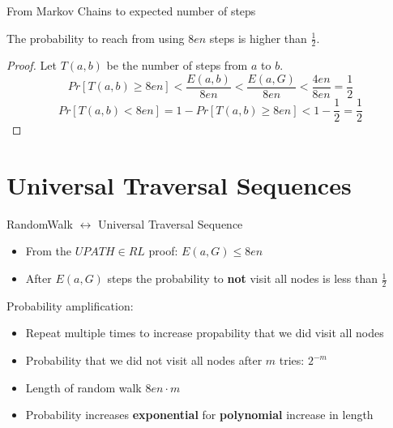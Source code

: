 \begin{frame}{From Markov Chains to expected number of steps}

\begin{theorem}
The probability to reach  from  using $8en$ steps is higher than $\frac{1}{2}$.
\end{theorem}

\begin{proof}
Let $T(a, b)$ be the number of steps from $a$ to $b$.
$$
Pr[T(a, b) \geq 8en] < \frac{E(a, b)}{8en}
                     < \frac{E(a, G)}{8en}
                     < \frac{4en}{8en} = \frac{1}{2}
$$
$$
Pr[T(a, b) < 8en] = 1 - Pr[T(a, b) \geq 8en]
                  < 1 - \frac{1}{2} = \frac{1}{2}
$$
\end{proof}

\end{frame}

\section{Universal Traversal
Sequences}\label{universal-traversal-sequences}

\begin{frame}{RandomWalk $\leftrightarrow$ Universal Traversal Sequence}

\begin{itemize}
\itemsep1pt\parskip0pt
\item
  From the $UPATH \in RL$ proof: $E(a, G) \leq 8en$
\item
  After $E(a, G)$ steps the probability to \textbf{not} visit all nodes
  is less than $\frac{1}{2}$
\end{itemize}

Probability amplification:

\begin{itemize}
\itemsep1pt\parskip0pt
\item
  Repeat multiple times to increase propability that we did visit all
  nodes
\item
  Probability that we did not visit all nodes after $m$ tries: $2^{-m}$
\item
  Length of random walk $8en \cdot m$
\item
  Probability increases \textbf{exponential} for \textbf{polynomial}
  increase in length
\end{itemize}

\end{frame}


